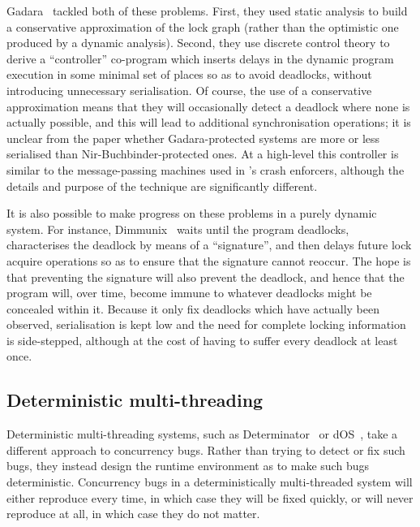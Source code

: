 Gadara~\cite{Wang2008} tackled both of these problems.  First, they
used static analysis to build a conservative approximation of the lock
graph (rather than the optimistic one produced by a dynamic analysis).
Second, they use discrete control theory to derive a ``controller''
co-program which inserts delays in the dynamic program execution in
some minimal set of places so as to avoid deadlocks, without
introducing unnecessary serialisation.  Of course, the use of a
conservative approximation means that they will occasionally detect a
deadlock where none is actually possible, and this will lead to
additional synchronisation operations; it is unclear from the paper
whether Gadara-protected systems are more or less serialised than
Nir-Buchbinder-protected ones.  At a high-level this controller is
similar to the message-passing machines used in {\technique}'s crash
enforcers, although the details and purpose of the technique are
significantly different.

It is also possible to make progress on these problems in a purely
dynamic system.  For instance, Dimmunix~\cite{Jula2008} waits until
the program deadlocks, characterises the deadlock by means of a
``signature'', and then delays future lock acquire operations so as to
ensure that the signature cannot reoccur.  The hope is that preventing
the signature will also prevent the deadlock, and hence that the
program will, over time, become immune to whatever deadlocks might be
concealed within it.  Because it only fix deadlocks which have
actually been observed, serialisation is kept low and the need for
complete locking information is side-stepped, although at the cost of
having to suffer every deadlock at least once.

\subsection{Deterministic multi-threading}

Deterministic multi-threading systems, such as
Determinator~\cite{Aviram2010} or dOS~\cite{Bergan2010}, take a
different approach to concurrency bugs.  Rather than trying to detect
or fix such bugs, they instead design the runtime environment as to
make such bugs deterministic.  Concurrency bugs in a deterministically
multi-threaded system will either reproduce every time, in which case
they will be fixed quickly, or will never reproduce at all, in which
case they do not matter.

